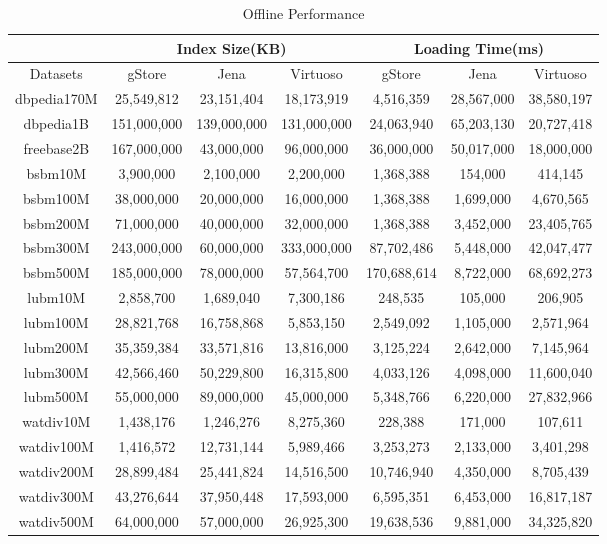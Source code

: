 \documentclass[titlepage, a4paper, 12pt] {article}
\begin{document}
\begin{table}[htp]
	\small
	\begin{threeparttable}
		\begin{tabular}{|c||c|c|c||c|c|c|}
			\hline
			& \multicolumn{3}{c||}{Index Size(KB)}& \multicolumn{3}{c|}{Loading Time(ms)}\\
			\hline
			\hline
			Datasets & gStore & Jena & Virtuoso & gStore & Jena & Virtuoso \\
			\hline
			dbpedia170M & 25,549,812 &	23,151,404	& 18,173,919 & 4,516,359	& 28,567,000 & 38,580,197	\\
			\hline
			dbpedia1B & 151,000,000 &	139,000,000	& 131,000,000 & 24,063,940	& 65,203,130 & 20,727,418	\\
			\hline
			freebase2B & 167,000,000 &	43,000,000	& 96,000,000 & 36,000,000	& 50,017,000 & 18,000,000	\\
			\hline
			bsbm10M & 3,900,000 &	2,100,000	& 2,200,000 & 1,368,388	& 154,000 & 414,145	\\
			\hline
			bsbm100M & 38,000,000 &	20,000,000	& 16,000,000 & 1,368,388	& 1,699,000 & 4,670,565	\\
			\hline
			bsbm200M & 71,000,000 &	40,000,000	& 32,000,000 & 1,368,388	& 3,452,000 & 23,405,765	\\
			\hline
			bsbm300M & 243,000,000 & 60,000,000	& 333,000,000 & 87,702,486	& 5,448,000 & 42,047,477	\\
			\hline
			bsbm500M & 185,000,000 &	78,000,000	& 57,564,700 & 170,688,614	& 8,722,000 & 68,692,273	\\
			\hline
			lubm10M  &2,858,700 &1,689,040 & 7,300,186 &	248,535 &	105,000 & 206,905	 \\
			\hline
			lubm100M & 28,821,768 &	16,758,868 & 5,853,150 & 2,549,092	& 1,105,000 & 2,571,964  \\
			\hline
			lubm200M & 35,359,384 &	33,571,816 & 13,816,000 & 3,125,224	& 2,642,000 & 7,145,964  \\
			\hline
			lubm300M & 42,566,460 &	50,229,800 & 16,315,800 & 4,033,126	& 4,098,000 & 11,600,040  \\
			\hline
			lubm500M & 55,000,000 & 89,000,000 & 45,000,000 & 5,348,766	& 6,220,000 & 27,832,966  \\
			\hline
			watdiv10M & 1,438,176 &	1,246,276 & 8,275,360 & 228,388	& 171,000 & 107,611  \\
			\hline
			watdiv100M & 1,416,572 & 12,731,144	 & 5,989,466 & 3,253,273 & 2,133,000 & 3,401,298	\\
			\hline
			watdiv200M & 28,899,484 &	25,441,824 & 14,516,500 & 10,746,940	& 4,350,000	& 8,705,439 \\
			\hline
			watdiv300M & 43,276,644 &	37,950,448	 & 17,593,000 & 6,595,351	& 6,453,000 & 16,817,187 \\
			\hline
			watdiv500M & 64,000,000 &	57,000,000	 & 26,925,300 & 19,638,536	& 9,881,000 & 34,325,820 \\
			\hline
		\end{tabular}
	\end{threeparttable}
	\caption{Offline Performance}
	\label{table:loading}
\end{table}
\end{document}
